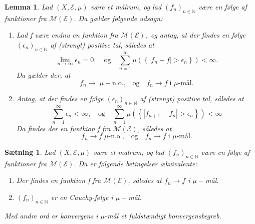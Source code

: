 \documentclass{article}
\newcommand{\N}{\mathbb{N}}
\newcommand{\1}{\mathbbm{1}}
\newtheorem{lemma}[theorem]{Lemma}
\newtheorem{proposition}[theorem]{Sætning}
\theoremstyle{boxed}
\begin{document}
\begin{theorem-box}
    \begin{lemma}
        Lad $(X,\mathcal{E},\mu)$ være et målrum, og lad $(f_n)_{n\in\N}$ være en følge af funktioner fra $\mathcal{M}(\mathcal{E})$. Da gælder følgende udsagn:
        \begin{enumerate}
            \item[\textnormal{(i)}] Lad f være endnu en funktion fra $\mathcal{M}(\mathcal{E}),$ og antag, at der findes en følge $(\epsilon_n)_{n\in\N}$ af (strengt) positive tal, således at
            $$\lim_{n\rightarrow \infty}\epsilon_n = 0, \quad \text{og}\quad \sum_{n=1}^{\infty}\mu\left(\left\{|f_n-f|>\epsilon_n\right\}\right)<\infty.$$
            Da gælder der, at
            $$f_n\rightarrow\; \mu-\text{n.o.,}\quad \text{og}\quad f_n\rightarrow f \; \text{i }\mu\text{-mål.}$$
            \item[\textnormal{(ii)}] Antag, at der findes en følge $(\epsilon_n)_{n\in\N}$ af (strengt) positive tal, således at
            $$\sum_{n=1}^{\infty}\epsilon_n < \infty,\quad \text{og} \quad \sum_{n=1}^{\infty} \mu\left(\left\{|f_{n+1}-f_n|>\epsilon_n\right\}\right)<\infty $$
            Da findes der en funtkion f fra $\mathcal{M}(\mathcal{E})$, således at
            $$f_n \rightarrow f \;\mu\text{-n.o.,}\quad \text{og} \quad f_n\rightarrow f \; \text{i }\mu\text{-mål.}$$ 
        \end{enumerate}
    \end{lemma}
\end{theorem-box}
\begin{theorem-box}
    \begin{proposition}
        Lad $(X,\mathcal{E},\mu)$ være et målrum, og lad $(f_n)_{n\in\N}$ være en følge af funktioner fra $\mathcal{M}(\mathcal{E})$. Da er følgende betingelser ækvivalente:
        \begin{enumerate}
            \item[\textnormal{(i)}] Der findes en funktion f fra $\mathcal{M}(\mathcal{E})$, således at $f_n\rightarrow f$ i $\mu-$mål.
            \item[\textnormal{(ii)}] $(f_n)_{n\in\N}$ er en Cauchy-følge i $\mu-$mål.
        \end{enumerate}
        Med andre ord er konvergens i $\mu$-mål et fuldstændigt konvergensbegreb.
        \end{proposition}
\end{theorem-box}
\end{document}
